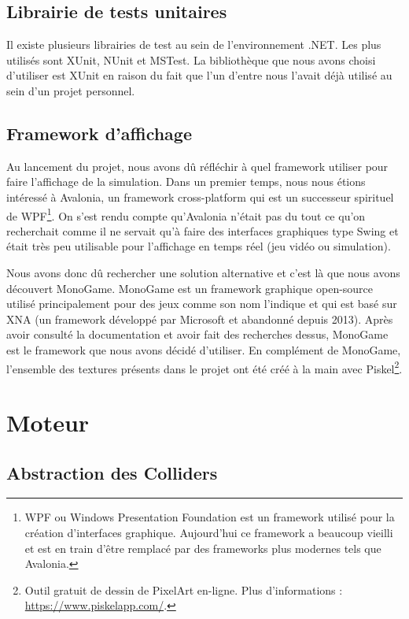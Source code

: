 \documentclass{EPUProjetDi}
\begin{document}
\subsection{Librairie de tests unitaires}

Il existe plusieurs librairies de test au sein de l'environnement .NET. Les plus utilisés sont XUnit, NUnit et MSTest.
La bibliothèque que nous avons choisi d'utiliser est XUnit en raison du fait que l'un d'entre nous l'avait déjà utilisé au sein d'un projet personnel.

\subsection{Framework d'affichage}

Au lancement du projet, nous avons dû réfléchir à quel framework utiliser pour faire l'affichage de la simulation.
Dans un premier temps, nous nous étions intéressé à Avalonia, un framework cross-platform qui est un successeur spirituel de WPF\footnote{WPF ou Windows Presentation Foundation est un framework 
utilisé pour la création d'interfaces graphique. Aujourd'hui ce framework a beaucoup vieilli et est en train d'être remplacé par des frameworks plus modernes tels que Avalonia.}.
On s'est rendu compte qu'Avalonia n'était pas du tout ce qu'on recherchait comme il ne servait qu'à faire des interfaces graphiques type Swing et 
était très peu utilisable pour l'affichage en temps réel (jeu vidéo ou simulation).

Nous avons donc dû rechercher une solution alternative et c'est là que nous avons découvert MonoGame. 
MonoGame est un framework graphique open-source utilisé principalement pour des jeux comme son nom l'indique et qui est basé
sur XNA (un framework développé par Microsoft et abandonné depuis 2013). 
Après avoir consulté la documentation et avoir fait des recherches dessus, MonoGame est le framework que nous avons décidé d'utiliser. 
En complément de MonoGame, l'ensemble des textures présents dans le projet ont été créé à la main avec Piskel\footnote{Outil gratuit de dessin de PixelArt en-ligne. 
Plus d'informations : \url{https://www.piskelapp.com/}.}. 

\section{Moteur}

\subsection{Abstraction des Colliders}
\end{document}
